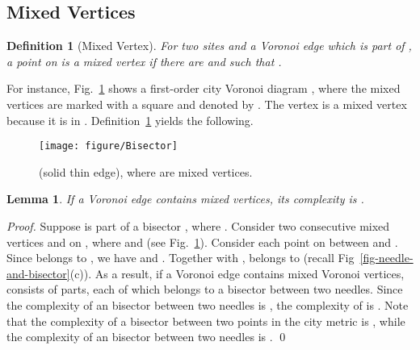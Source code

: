 \documentclass[11pt]{llncs}
\newtheorem{Lemma}{Lemma}
\newtheorem{Definition}{Definition}
\newcommand{\deleted}[1]{}
\begin{document}
\subsection{Mixed Vertices}\label{sub-mix}

\deleted
{
\begin{figure}[bt]
\centering
\texttt{[image: figure/Bisectors-Without-Label]}
\caption{ , where  for  is a mixed vertices.}\label{fig-Bisectors}
\end{figure}
}



\begin{Definition}[Mixed Vertex]\label{def-mix-voronoi-vertex}
For two sites  and a Voronoi edge  which is part of ,
a point  on  is \emph{a mixed vertex}
if there are  and  such that
.
\end{Definition}


For instance,
Fig.~\ref{fig-Bisectors} shows a first-order city Voronoi diagram , where the mixed vertices
are marked with a square and denoted by .
The vertex  is a mixed vertex because it is in .
Definition~\ref{def-mix-voronoi-vertex} yields the following.




\begin{figure}
\centering
\texttt{[image: figure/Bisector]}
\caption{  (solid thin edge), where  are mixed vertices.}\label{fig-Bisectors}
\end{figure}


\newcommand{\lemmVvtext}{If a Voronoi edge  contains  mixed vertices,
its complexity is .
}

\begin{Lemma}\label{lem-mVv}
\lemmVvtext
\end{Lemma}
\begin{proof}
Suppose  is part of a bisector , where .
Consider two consecutive mixed vertices  and  on ,
where  and 
(see Fig.~\ref{fig-Bisectors}).
Consider each point  on  between  and .
Since  belongs to ,
we have  and .
Together with ,
 belongs to  (recall Fig~\ref{fig-needle-and-bisector}(c)).
As a result, if a Voronoi edge  contains  mixed Voronoi vertices,
 consists of  parts, each of which belongs to a bisector between two needles.
Since the complexity of an  bisector between two needles is  \cite{BC-05},
the complexity of  is .
Note that the complexity of a bisector between two points in the city metric is ,
while the complexity of an  bisector between two needles is .
\qed
\end{proof}
\end{document}
